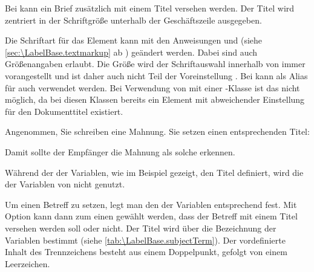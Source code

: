 \begin{Declaration}
\end{Declaration}
Bei \KOMAScript{} kann ein Brief zusätzlich mit einem Titel
versehen werden. Der Titel wird zentriert in der Schriftgröße 
unterhalb der Geschäftszeile ausgegeben.

%
%
Die Schriftart für das Element %
 kann mit den Anweisungen
 und
 (siehe
\autoref{sec:\LabelBase.textmarkup} ab
) geändert werden. Dabei sind auch
Größenangaben erlaubt. Die Größe  wird der Schriftauswahl
innerhalb von \KOMAScript{} immer vorangestellt und ist daher auch nicht
Teil der Voreinstellung
. Bei
 kann als Alias für
 auch
 verwendet werden. Bei
Verwendung von  mit einer \KOMAScript-Klasse ist das
nicht möglich, da bei diesen Klassen bereits ein Element
 mit abweichender Einstellung für den Dokumenttitel
existiert.%
%
%
\begin{Example}
  Angenommen, Sie schreiben eine Mahnung. Sie setzen einen
  entsprechenden Titel:
\begin{lstcode}
\end{lstcode}
  Damit sollte der Empfänger die Mahnung als solche erkennen.
\end{Example}
Während der  der Variablen, wie im Beispiel gezeigt, den Titel
definiert, wird die  der Variablen  von
\KOMAScript{} nicht genutzt.
%
\EndIndexGroup


\begin{Declaration}
\end{Declaration}
%
Um einen Betreff zu setzen, legt man den  der Variablen
 entsprechend fest. Mit Option
 kann
dann zum einen gewählt werden, dass der Betreff mit einem Titel versehen
werden soll oder nicht. Der Titel wird über die Bezeichnung der Variablen
 bestimmt (siehe \autoref{tab:\LabelBase.subjectTerm}).
Der vordefinierte Inhalt des
Trennzeichens  besteht aus
einem Doppelpunkt, gefolgt von einem Leerzeichen.

